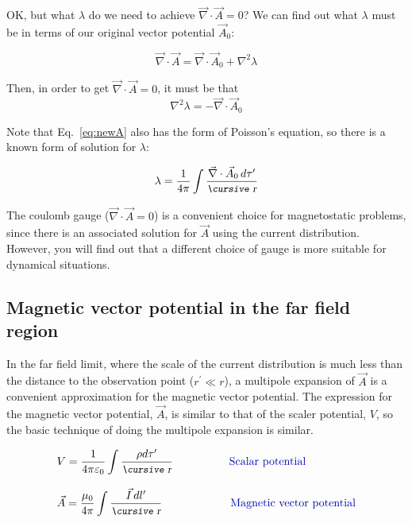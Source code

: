 \documentclass[12pt]{article}
\begin{document}
\begin{flushleft}
OK, but what $\lambda$ do we need to achieve $\vec{\nabla} \cdot \vec{A} = 0$?  We can find out what $\lambda$ must be in terms of our original vector potential $\vec{A}_{0}$:

\[
\vec{\nabla} \cdot \vec{A}  = \vec{\nabla} \cdot \vec{A}_{0} + \nabla^{2}\lambda 
\]

Then, in order to get $\vec{\nabla} \cdot \vec{A} =0$, it must be that
\begin{equation}
 \nabla^{2}\lambda =  -\vec{\nabla} \cdot \vec{A}_{0} 
\label{eq:newA}
\end{equation}

Note that Eq.~\ref{eq:newA} also has the form of Poisson's equation, so there is a known form of solution for $\lambda$:

\[
\lambda = \frac{1}{4\pi} \int \frac{\vec{\nabla} \cdot \vec{A}_{0}\, d\tau^{\prime}}{\text{\small\slshape\cursive r}}
\]

The coulomb gauge ($\vec{\nabla} \cdot \vec{A} = 0$) is a convenient choice for magnetostatic problems, since there is an associated solution for $\vec{A}$  using the current distribution.  However, you will find out that a different choice of gauge is more suitable for dynamical situations.


\subsection*{\bf \color{myblue} Magnetic vector potential in the far field region}

In the far field limit, where the scale of the current distribution is much less than the distance to the observation point ($r^{\prime} \ll r$), a multipole expansion of $\vec{A}$ is a convenient approximation for the magnetic vector potential.  The expression for the magnetic vector potential, $\vec{A}$, is similar to that of the scaler potential, $V$, so the basic technique of doing the multipole expansion is similar.

\begin{eqnarray*}
\begin{aligned}
& V=\frac{1}{4\pi \varepsilon_{0}} \int \frac{\rho d\tau^{\prime}}{\text{\small\slshape\cursive r}} \hspace{.7in} \text{\color{myblue} Scalar potential}\\[8pt]
& \vec{A} = \frac{\mu_{0}}{4\pi} \int \frac{\vec{I} \, dl^{\prime}}{\text{\small\slshape\cursive r}} \hspace{.85in} \text{\color{myblue} Magnetic vector potential}
\end{aligned}
\end{eqnarray*}


\end{flushleft}
\end{document}

